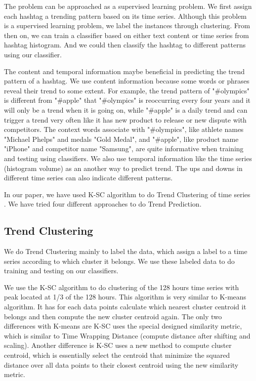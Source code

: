 \documentclass{article}
\begin{document}
The problem can be approached as a supervised learning problem. We first assign each hashtag a trending pattern based on its time series. Although this problem is a supervised learning problem, we label the instances through clustering. From then on, we can train a classifier based on either text content or time series from hashtag histogram. And we could then classify the hashtag to different patterns using our classifier. 

The content and temporal information maybe beneficial in predicting the trend pattern of a hashtag. We use content information because some words or phrases reveal their trend to some extent. For example, the trend pattern of "\#olympics" is different from "\#apple" that "\#olympics" is reoccurring every four years and it will only be a trend when it is going on, while "\#apple" is a daily trend and can trigger a trend very often like it has new product to release or new dispute with competitors. The context words associate with "\#olympics", like athlete names "Michael Phelps" and medals "Gold Medal", and "\#apple", like product name "iPhone" and competitor name "Samsung", are quite informative when training and testing using classifiers. We also use temporal information like the time series (histogram volume) as an another way to predict trend. The ups and downs in different time series can also indicate different patterns.      

In our paper, we have used K-SC algorithm to do Trend Clustering of time series \cite{Yang11}. We have tried four different approaches to do Trend Prediction.  

\subsection{Trend Clustering}

We do Trend Clustering mainly to label the data, which assign a label to a time series according to which cluster it belongs. We use these labeled data to do training and testing on our classifiers. 

We use the K-SC algorithm \cite{Yang11} to do clustering of the 128 hours time series with peak located at 1/3 of the 128 hours. This algorithm is very similar to K-means algorithm. It has for each data points calculate which nearest cluster centroid it belongs and then compute the new cluster centroid again. The only two differences with K-means are K-SC uses the special designed similarity metric, which is similar to Time Wrapping Distance (compute distance after shifting and scaling). Another difference is K-SC uses a new method to compute cluster centroid, which is essentially select the centroid that minimize the squared distance over all data points to their closest centroid using the new similarity metric.     
\end{document}
